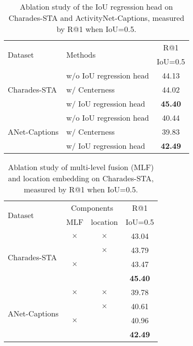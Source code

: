 \documentclass[10pt,twocolumn,letterpaper]{article}
\begin{document}
	\begin{table}[!t]
		\centering
		\caption{Ablation study of the IoU regression head on Charades-STA and ActivityNet-Captions, measured by R@1 when IoU=0.5.}
		\begin{tabular}{l|l|c}
			\hline
			\multirow{2}{*}{Dataset} & \multirow{2}{*}{Methods} & R@1         \\
			&                          & IoU=0.5 \\ \hline
			\multirow{3}{*}{Charades-STA}     &    w/o IoU regression head      & 44.13  \\ 
			&    w/ Centerness          & 44.02    \\
			&    w/ IoU regression head     & \textbf{45.40}    \\
			\hline \hline
			\multirow{3}{*}{ANet-Captions}     &    w/o IoU regression head                   & 40.44       \\
			&    w/ Centerness                   & 39.83       \\
			&    w/ IoU regression head                   & \textbf{42.49}       \\
			\hline
\end{tabular}\label{tab:iou}
\end{table}

	\begin{table}[!t]
	\centering
	\caption{Ablation study of multi-level fusion (MLF) and location embedding on Charades-STA, measured by R@1 when IoU=0.5.}
	\begin{tabular}{l|cc|c}
		\hline
		\multirow{2}{*}{Dataset}       & \multicolumn{2}{c|}{Components} & R@1     \\ \cline{2-3}
		& MLF          & location         & IoU=0.5 \\ \hline
		\multirow{4}{*}{Charades-STA}  &    $\times$       &     $\times$  &  43.04       \\
		&    \checkmark         &       $\times$           &   43.79      \\
		&    $\times$          &    \checkmark            &   43.47      \\
		&    \checkmark         &     \checkmark    &  \textbf{45.40}       \\ \hline \hline
		\multirow{4}{*}{ANet-Captions} &    $\times$          &    $\times$              &     39.78    \\
		&    \checkmark          &     $\times$             &  40.61       \\
		&   $\times$           &    \checkmark              &  40.96       \\
		&     \checkmark         &     \checkmark             &  \textbf{42.49}     \\ \hline 
	\end{tabular}\label{tab:mlf}
\vspace{-0.1in}
\end{table}
\end{document}
